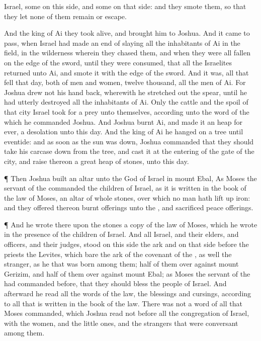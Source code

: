 {Israel, some on this side, and some on that side: and they
smote them, so
that they
let none of them
remain or
escape.
\par }{\PP {}And the
king of
Ai they
took
alive, and
brought him to
Joshua.
And it came to pass, when
Israel had made an
end of
slaying all the
inhabitants of
Ai in the
field, in the
wilderness wherein they
chased them, and when they were all
fallen on the
edge of the
sword, until they were
consumed, that all the
Israelites
returned unto
Ai, and
smote it with the
edge of the
sword.
And
{} it was,
{} all that
fell that
day, both of
men and
women,
{}
twelve
thousand,
{} all the
men of
Ai.
For
Joshua
drew not his
hand
back, wherewith he stretched
out the
spear, until he had utterly
destroyed all the
inhabitants of
Ai.
Only the
cattle and the
spoil of that
city
Israel took for a
prey unto themselves, according unto the
word of the
{} which he
commanded
Joshua.
And
Joshua
burnt
Ai, and
made it an
heap for
ever,
{} a
desolation unto this
day.
And the
king of
Ai he
hanged on a
tree until
eventide: and as soon as the
sun was
down,
Joshua
commanded that they should
take his
carcase
down from the
tree, and
cast it at the
entering of the
gate of the
city, and
raise thereon a
great
heap of
stones,
{} unto this
day.
\par }{\PP {}¶ Then
Joshua
built an
altar unto the
{}
God of
Israel in
mount
Ebal,
As
Moses the
servant of the
{}
commanded the
children of
Israel, as it is
written in the
book of the
law of
Moses, an
altar of
whole
stones, over which no man hath lift
up
{}
iron: and they
offered thereon burnt
offerings unto the
{}, and
sacrificed peace
offerings.
\par }{\PP {}¶ And he
wrote there upon the
stones a
copy of the
law of
Moses, which he
wrote in the
presence of the
children of
Israel.
And all
Israel, and their
elders, and
officers, and their
judges,
stood on this side the
ark and on that side before the
priests the
Levites, which
bare the
ark of the
covenant of the
{}, as well the
stranger, as he that was
born among them;
half of them
over
against
mount
Gerizim, and
half of them over
against
mount
Ebal; as
Moses the
servant of the
{} had
commanded
before, that they should
bless the
people of
Israel.
And
afterward he
read all the
words of the
law, the
blessings and
cursings, according to all that is
written in the
book of the
law.
There was not a
word of all that
Moses
commanded, which
Joshua
read not before all the
congregation of
Israel, with the
women, and the little
ones, and the
strangers that were
conversant
among them.

}

